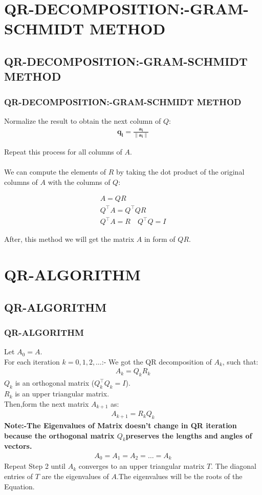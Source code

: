\documentclass{beamer}
\theoremstyle{remark}
\providecommand{\norm}[1]{\lVert#1\rVert}
\let\vec\mathbf
\numberwithin{equation}{section}
\begin{document}
\section{QR-DECOMPOSITION:-GRAM-SCHMIDT METHOD}
\subsection{QR-DECOMPOSITION:-GRAM-SCHMIDT METHOD}
\begin{frame}
\frametitle{QR-DECOMPOSITION:-GRAM-SCHMIDT METHOD}

Normalize the result to obtain the next column of $ Q $:
\begin{align}
\vec{q_i} = \frac{\vec{a_i}}{\norm{\vec{a_i}}}
\end{align}

Repeat this process for all columns of $ A $.\\
\text{  }\\
We can compute the elements of $R$ by taking the dot product of the original columns of $A$ with the columns of $Q$:

\begin{align}
    A=QR\\
    Q^\top A = Q^\top QR \\
    Q^\top A = R \quad  Q^\top Q = I
\end{align}

After, this method we will get the matrix $A$ in form of $QR$.
\end{frame}

\section{QR-ALGORITHM}
\subsection{QR-ALGORITHM}
\begin{frame}
\frametitle{QR-ALGORITHM}

Let $A_0 = A $.\\
For each iteration $ k = 0, 1, 2, \dots $:-
   We got the QR decomposition of $ A_k $, such that:
    \begin{align}
    A_k = Q_k R_k
    \end{align}
    $Q_k $ is an orthogonal matrix ($ Q_k^\top Q_k = I $).\\
  $ R_k $ is an upper triangular matrix.\\
Then,form the next matrix $ A_{k+1} $ as:
    \begin{align}
    A_{k+1} = R_k Q_k
    \end{align}
\textbf{Note:-The Eigenvalues of Matrix doesn't change in QR iteration because the orthogonal matrix $Q_k$​ preserves the lengths and angles of vectors.}
  \begin{align}
    A_0 =A_1 =A_2 = \dots = A_k
    \end{align}
Repeat Step 2 until $ A_k $ converges to an upper triangular matrix $ T $. The diagonal entries of $T$ are the eigenvalues of $A$.The eigenvalues will be the roots of the Equation.

\end{frame}
\end{document}
